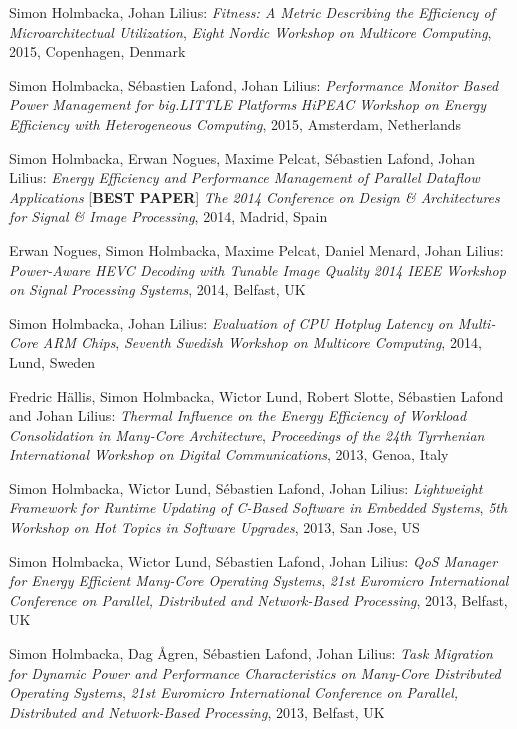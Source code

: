 \documentclass[margin,line]{resume}
\begin{document}
\begin{resume}
Simon Holmbacka, Johan Lilius: 
\textit{Fitness: A Metric Describing the Efficiency of Microarchitectual Utilization},
\textsl{Eight Nordic Workshop on Multicore Computing}, 2015, Copenhagen, Denmark

Simon Holmbacka, S\'{e}bastien Lafond, Johan Lilius:
\textit{Performance Monitor Based Power Management for big.LITTLE Platforms}
\textsl{HiPEAC Workshop on Energy Efficiency with Heterogeneous Computing}, 2015, Amsterdam, Netherlands

Simon Holmbacka, Erwan Nogues, Maxime Pelcat, S\'{e}bastien Lafond, Johan Lilius:
\textit{Energy Efficiency and Performance Management of Parallel Dataflow Applications} [\textbf{BEST PAPER}]
\textsl{The 2014 Conference on Design \& Architectures for Signal \& Image Processing}, 2014, Madrid, Spain

Erwan Nogues, Simon Holmbacka, Maxime Pelcat, Daniel Menard, Johan Lilius:
\textit{Power-Aware HEVC Decoding with Tunable Image Quality}
\textsl{2014 IEEE Workshop on Signal Processing Systems}, 2014, Belfast, UK

Simon Holmbacka, Johan Lilius: 
\textit{Evaluation of CPU Hotplug Latency on Multi-Core ARM Chips},
\textsl{Seventh Swedish Workshop on Multicore Computing}, 2014, Lund, Sweden 

Fredric H\"{a}llis, Simon Holmbacka, Wictor Lund, Robert Slotte, S\'{e}bastien Lafond and Johan Lilius:
\textit{Thermal Influence on the Energy Efficiency of Workload Consolidation in Many-Core Architecture}, 
\textsl{Proceedings of the 24th Tyrrhenian International Workshop on Digital Communications}, 2013, Genoa, Italy 

Simon Holmbacka, Wictor Lund, S\'{e}bastien Lafond, Johan Lilius: 
\textit{Lightweight Framework for Runtime Updating of C-Based Software in Embedded Systems},
\textsl{5th Workshop on Hot Topics in Software Upgrades}, 2013, San Jose, US

Simon Holmbacka, Wictor Lund, S\'{e}bastien Lafond, Johan Lilius: 
\textit{QoS Manager for Energy Efficient Many-Core Operating Systems},
\textsl{21st Euromicro International Conference on Parallel, Distributed and Network-Based Processing}, 2013, Belfast, UK

Simon Holmbacka, Dag \AA{}gren, S\'{e}bastien Lafond, Johan Lilius: 
\textit{Task Migration for Dynamic Power and Performance Characteristics on Many-Core Distributed Operating Systems},
\textsl{21st Euromicro International Conference on Parallel, Distributed and Network-Based Processing}, 2013, Belfast, UK


\end{resume}
\end{document}
